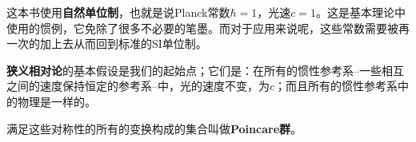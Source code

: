这本书使用{\bf 自然单位制}，也就是说Planck常数$\hbar = 1$，光速$c=1$。这是基本理论中使用的惯例，它免除了很多不必要的笔墨。而对于应用来说呢，这些常数需要被再一次的加上去从而回到标准的SI单位制。

{\bf 狭义相对论}的基本假设是我们的起始点；它们是：在所有的惯性参考系--一些相互之间的速度保持恒定的参考系--中，光的速度不变，为$c$；而且所有的惯性参考系中的物理是一样的。

满足这些对称性的所有的变换构成的集合叫做{\bf Poincare群}。





